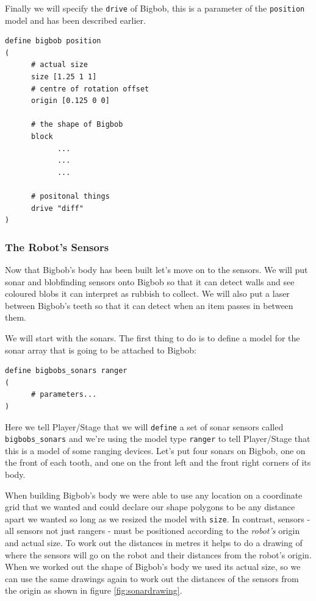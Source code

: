 \documentclass[a4paper]{report}
\newcommand{\plst}{Player/Stage\xspace}
\begin{document}
Finally we will specify the \verb|drive| of Bigbob, this is a parameter of the \verb|position| model and has been described earlier.
\begin{verbatim}
define bigbob position
(
      # actual size
      size [1.25 1 1]
      # centre of rotation offset
      origin [0.125 0 0]

      # the shape of Bigbob
      block
            ...
            ...
            ...
      
      # positonal things
      drive "diff"
)
\end{verbatim}


\subsubsection{The Robot's Sensors}\label{sec:examplerobotsensors}
Now that Bigbob's body has been built let's move on to the sensors. We will put sonar and blobfinding sensors onto Bigbob so that it can detect walls and see coloured blobs it can interpret as rubbish to collect. We will also put a laser between Bigbob's teeth so that it can detect when an item passes in between them.

We will start with the sonars. The first thing to do is to define a model for the sonar array that is going to be attached to Bigbob:
\begin{verbatim}
define bigbobs_sonars ranger
(
      # parameters...
)
\end{verbatim}
Here we tell \plst that we will \verb|define| a set of sonar sensors called \verb|bigbobs_sonars| and we're using the model type \verb|ranger| to tell \plst that this is a model of some ranging devices. Let's put four sonars on Bigbob, one on the front of each tooth, and one on the front left and the front right corners of its body. 

When building Bigbob's body we were able to use any location on a coordinate grid that we wanted and could declare our shape polygons to be any distance apart we wanted so long as we resized the model with \verb|size|. In contrast, sensors - all sensors not just rangers - must be positioned according to the \emph{robot's} origin and actual size. To work out the distances in metres it helps to do a drawing of where the sensors will go on the robot and their distances from the robot's origin. When we worked out the shape of Bigbob's body we used its actual size, so we can use the same drawings again to work out the distances of the sensors from the origin as shown in figure \ref{fig:sonardrawing}.
\end{document}
